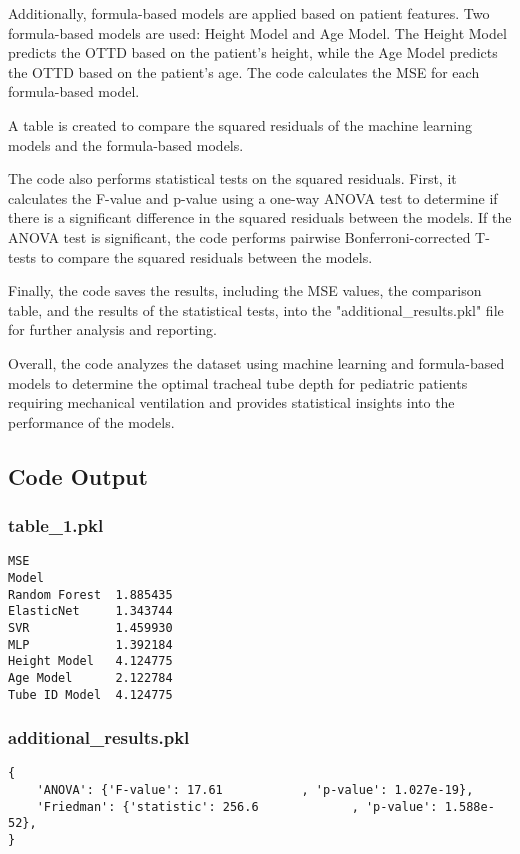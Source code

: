 \documentclass[11pt]{article}
\begin{document}
Additionally, formula-based models are applied based on patient features. Two formula-based models are used: Height Model and Age Model. The Height Model predicts the OTTD based on the patient's height, while the Age Model predicts the OTTD based on the patient's age. The code calculates the MSE for each formula-based model.

A table is created to compare the squared residuals of the machine learning models and the formula-based models.

The code also performs statistical tests on the squared residuals. First, it calculates the F-value and p-value using a one-way ANOVA test to determine if there is a significant difference in the squared residuals between the models. If the ANOVA test is significant, the code performs pairwise Bonferroni-corrected T-tests to compare the squared residuals between the models.

Finally, the code saves the results, including the MSE values, the comparison table, and the results of the statistical tests, into the "additional\_results.pkl" file for further analysis and reporting.

Overall, the code analyzes the dataset using machine learning and formula-based models to determine the optimal tracheal tube depth for pediatric patients requiring mechanical ventilation and provides statistical insights into the performance of the models.

\subsection{Code Output}

\subsubsection*{table\_1.pkl}

\begin{Verbatim}[tabsize=4]
                    MSE
Model
Random Forest  1.885435
ElasticNet     1.343744
SVR            1.459930
MLP            1.392184
Height Model   4.124775
Age Model      2.122784
Tube ID Model  4.124775
\end{Verbatim}

\subsubsection*{additional\_results.pkl}

\begin{Verbatim}[tabsize=4]
{
    'ANOVA': {'F-value': 17.61           , 'p-value': 1.027e-19},
    'Friedman': {'statistic': 256.6             , 'p-value': 1.588e-52},
}
\end{Verbatim}
\end{document}
